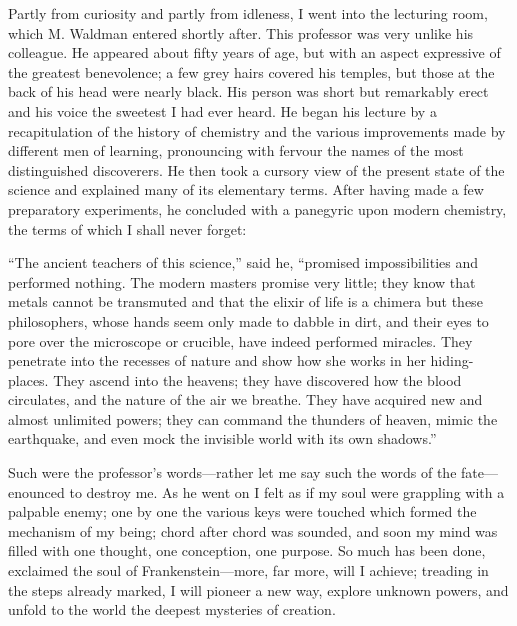 \documentclass[12pt,openright]{book}
\begin{document}
Partly from curiosity and partly from idleness, I went into the lecturing room, which M. Waldman entered shortly after. This professor was very unlike his colleague. He appeared about fifty years of age, but with an aspect expressive of the greatest benevolence; a few grey hairs covered his temples, but those at the back of his head were nearly black. His person was short but remarkably erect and his voice the sweetest I had ever heard. He began his lecture by a recapitulation of the history of chemistry and the various improvements made by different men of learning, pronouncing with fervour the names of the most distinguished discoverers. He then took a cursory view of the present state of the science and explained many of its elementary terms. After having made a few preparatory experiments, he concluded with a panegyric upon modern chemistry, the terms of which I shall never forget:

“The ancient teachers of this science,” said he, “promised impossibilities and performed nothing. The modern masters promise very little; they know that metals cannot be transmuted and that the elixir of life is a chimera but these philosophers, whose hands seem only made to dabble in dirt, and their eyes to pore over the microscope or crucible, have indeed performed miracles. They penetrate into the recesses of nature and show how she works in her hiding-places. They ascend into the heavens; they have discovered how the blood circulates, and the nature of the air we breathe. They have acquired new and almost unlimited powers; they can command the thunders of heaven, mimic the earthquake, and even mock the invisible world with its own shadows.”

Such were the professor’s words—rather let me say such the words of the fate—enounced to destroy me. As he went on I felt as if my soul were grappling with a palpable enemy; one by one the various keys were touched which formed the mechanism of my being; chord after chord was sounded, and soon my mind was filled with one thought, one conception, one purpose. So much has been done, exclaimed the soul of Frankenstein—more, far more, will I achieve; treading in the steps already marked, I will pioneer a new way, explore unknown powers, and unfold to the world the deepest mysteries of creation.
\end{document}
